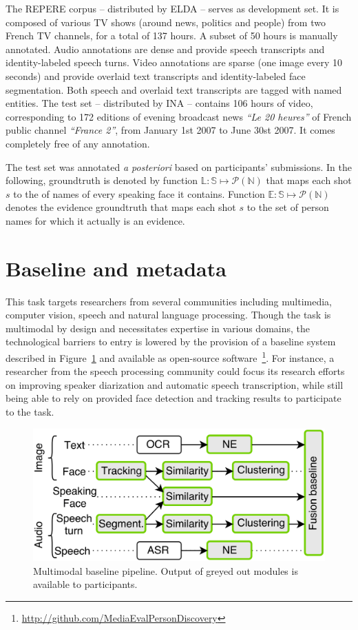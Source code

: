 \documentclass{acm_proc_article-me}
\newcommand\refEvidences{\mathbb{E}}
\newcommand\refLabels{\mathbb{L}}
\newcommand\refNames{\mathbb{N}}
\newcommand\shots{\mathbb{S}}
\begin{document}
The REPERE corpus -- distributed by ELDA -- serves as development set. It is composed of various TV shows (around news, politics and people) from two French TV channels, for a total of 137 hours. A subset of 50 hours is manually annotated. Audio annotations are dense and provide speech transcripts and identity-labeled speech turns. Video annotations are sparse (one image every 10 seconds) and provide overlaid text transcripts and identity-labeled face segmentation. Both speech and overlaid text transcripts are tagged with named entities.
The test set -- distributed by INA -- contains 106 hours of video, corresponding to 172 editions of evening broadcast news \emph{``Le 20 heures''} of French public channel \emph{``France 2''}, from January 1st 2007 to June 30st 2007. It comes completely free of any annotation.

The test set was annotated \emph{a posteriori} based on participants' submissions. In the following, groundtruth is denoted by function $\refLabels : \shots \mapsto \mathcal{P}(\refNames)$ that maps each shot $s$ to the of names of every speaking face it contains. Function $\refEvidences : \shots \mapsto \mathcal{P}(\refNames)$ denotes the evidence groundtruth that maps each shot $s$ to the set of person names for which it actually is an evidence.

\section{Baseline and metadata}

This task targets researchers from several communities including multimedia, computer vision, speech and natural language processing. Though the task is multimodal by design and necessitates expertise in various domains, the technological barriers to entry is lowered by the provision of a baseline system described in Figure~\ref{fig:baseline} and available as open-source software~\footnote{\url{http://github.com/MediaEvalPersonDiscovery}}.
For instance, a researcher from the speech processing community could focus its research efforts on improving speaker diarization and automatic speech transcription, while still being able to rely on provided face detection and tracking results to participate to the task.

\begin{figure}[htb]
 \center
 \includegraphics[width=1\linewidth]{figs/baseline.png}
 \centering
 \caption {Multimodal baseline pipeline. Output of greyed out modules is available to participants.}
 \label{fig:baseline}
\end{figure}
\end{document}
